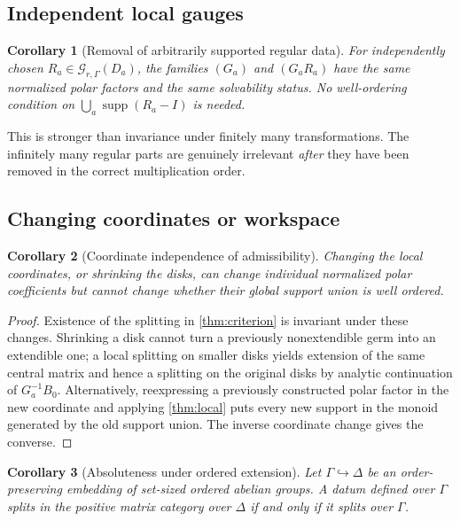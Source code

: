 \documentclass[11pt,letterpaper]{article}
\newtheorem{corollary}[corollary]{Corollary}
\theoremstyle{definition}
\theoremstyle{remark}
\newcommand{\GG}{\mathscr G_{r,\Gamma}}
\newcommand{\supp}{\operatorname{supp}}
\numberwithin{equation}{section}
\begin{document}
\subsection{Independent local gauges}

\begin{corollary}[Removal of arbitrarily supported regular data]\label{cor:localgauges}
For independently chosen $R_a\in\GG(D_a)$, the families $(G_a)$ and $(G_aR_a)$ have the same normalized polar factors and the same solvability status. No well-ordering condition on $\bigcup_a\supp(R_a-I)$ is needed.
\end{corollary}

This is stronger than invariance under finitely many transformations. The infinitely many regular parts are genuinely irrelevant \emph{after} they have been removed in the correct multiplication order.

\subsection{Changing coordinates or workspace}

\begin{corollary}[Coordinate independence of admissibility]\label{cor:coordinates}
Changing the local coordinates, or shrinking the disks, can change individual normalized polar coefficients but cannot change whether their global support union is well ordered.
\end{corollary}

\begin{proof}
Existence of the splitting in \cref{thm:criterion} is invariant under these changes. Shrinking a disk cannot turn a previously nonextendible germ into an extendible one; a local splitting on smaller disks yields extension of the same central matrix and hence a splitting on the original disks by analytic continuation of $G_a^{-1}B_0$. Alternatively, reexpressing a previously constructed polar factor in the new coordinate and applying \cref{thm:local} puts every new support in the monoid generated by the old support union. The inverse coordinate change gives the converse.
\end{proof}

\begin{corollary}[Absoluteness under ordered extension]\label{cor:extension}
Let $\Gamma\hookrightarrow\Delta$ be an order-preserving embedding of set-sized ordered abelian groups. A datum defined over $\Gamma$ splits in the positive matrix category over $\Delta$ if and only if it splits over $\Gamma$.
\end{corollary}
\end{document}
